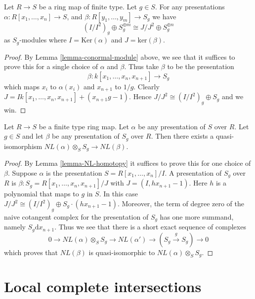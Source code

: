 \begin{lemma}
\label{lemma-conormal-module-localize}
Let $R \to S$ be a ring map of finite type.
Let $g \in S$. For any presentations
$\alpha : R[x_1, \ldots, x_n] \to S$, and
$\beta : R[y_1, \ldots, y_m] \to S_g$ we have
$$
(I/I^2)_g \oplus S^{\oplus m}_g \cong J/J^2 \oplus S_g^{\oplus n}
$$
as $S_g$-modules where
$I = \text{Ker}(\alpha)$ and $J = \text{ker}(\beta)$.
\end{lemma}

\begin{proof}
By Lemma \ref{lemma-conormal-module} above, we see that
it suffices to prove this for a single choice of $\alpha$
and $\beta$. Thus take $\beta$ to be the presentation
$$
\beta : k[x_1, \ldots, x_n , x_{n + 1}] \longrightarrow S_g
$$
which maps $x_i$ to $\alpha(x_i)$ and $x_{n + 1}$ to $1/g$.
Clearly $J = Ik[x_1, \ldots, x_n , x_{n + 1}] +
(x_{n + 1}g - 1)$. Hence $J/J^2 \cong (I/I^2)_g \oplus S_g$
and we win.
\end{proof}

\begin{lemma}
\label{lemma-localize-NL}
Let $R \to S$ be a finite type ring map.
Let $\alpha$ be any presentation of $S$ over $R$.
Let $g \in S$ and let $\beta$ be any presentation of $S_g$ over $R$.
Then there exists a quasi-isomorphism
$NL(\alpha)\otimes_S S_g \to NL(\beta)$.
\end{lemma}

\begin{proof}
By Lemma \ref{lemma-NL-homotopy} it suffices to prove this
for one choice of $\beta$. Suppose $\alpha$ is the
presentation $S = R[x_1, \ldots, x_n]/I$.
A presentation of $S_g$ over $R$ is
$\beta : S_g = R[x_1, \ldots, x_n, x_{n + 1}]/J$ with
$J = (I, h x_{n + 1} - 1)$. Here $h$ is a polynomial
that maps to $g$ in $S$. In this case $J/J^2
\cong (I/I^2)_g \oplus S_g \cdot (h x_{n + 1} - 1)$.
Moreover, the term of degree zero of the naive cotangent complex
for the presentation of $S_g$ has one more summand,
namely $S_g \text{d}x_{n + 1}$. Thus we see that
there is a short exact sequence of complexes
$$
0 \to NL(\alpha) \otimes_S S_g \to NL(\alpha') \to
(S_g \xrightarrow{g} S_g) \to 0
$$
which proves that $NL(\beta)$ is quasi-isomorphic to
$NL(\alpha) \otimes_S S_g$.
\end{proof}







\section{Local complete intersections}
\label{section-lci}

